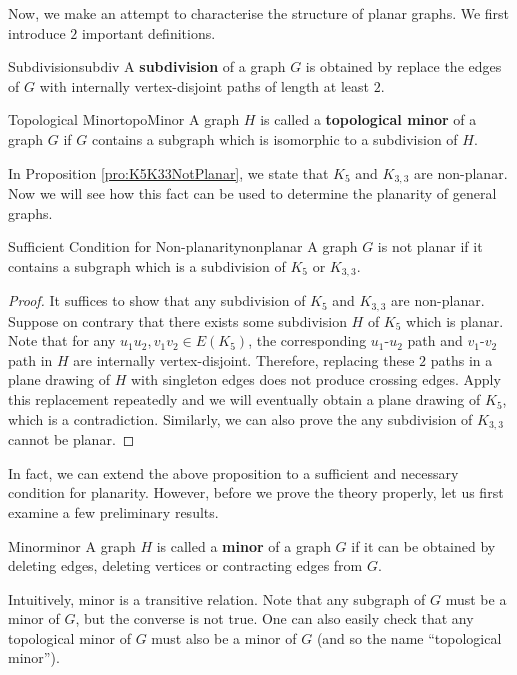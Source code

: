 \documentclass[math, code]{amznotes}
\theoremstyle{remark}
\begin{document}
Now, we make an attempt to characterise the structure of planar graphs. We first introduce $2$ important definitions.
\begin{dfnbox}{Subdivision}{subdiv}
    A {\color{red} \textbf{subdivision}} of a graph $G$ is obtained by replace the edges of $G$ with internally vertex-disjoint paths of length at least $2$.
\end{dfnbox}
\begin{dfnbox}{Topological Minor}{topoMinor}
    A graph $H$ is called a {\color{red} \textbf{topological minor}} of a graph $G$ if $G$ contains a subgraph which is isomorphic to a subdivision of $H$.
\end{dfnbox}
In Proposition \ref{pro:K5K33NotPlanar}, we state that $K_5$ and $K_{3, 3}$ are non-planar. Now we will see how this fact can be used to determine the planarity of general graphs.
\begin{probox}{Sufficient Condition for Non-planarity}{nonplanar}
    A graph $G$ is not planar if it contains a subgraph which is a subdivision of $K_5$ or $K_{3, 3}$.
    \tcblower
    \begin{proof}
        It suffices to show that any subdivision of $K_5$ and $K_{3, 3}$ are non-planar. Suppose on contrary that there exists some subdivision $H$ of $K_5$ which is planar. Note that for any $u_1u_2, v_1v_2 \in E(K_5)$, the corresponding $u_1$-$u_2$ path and $v_1$-$v_2$ path in $H$ are internally vertex-disjoint. Therefore, replacing these $2$ paths in a plane drawing of $H$ with singleton edges does not produce crossing edges. Apply this replacement repeatedly and we will eventually obtain a plane drawing of $K_5$, which is a contradiction. Similarly, we can also prove the any subdivision of $K_{3, 3}$ cannot be planar.
    \end{proof}
\end{probox}
In fact, we can extend the above proposition to a sufficient and necessary condition for planarity. However, before we prove the theory properly, let us first examine a few preliminary results.
\begin{dfnbox}{Minor}{minor}
    A graph $H$ is called a {\color{red} \textbf{minor}} of a graph $G$ if it can be obtained by deleting edges, deleting vertices or contracting edges from $G$.
\end{dfnbox}
Intuitively, minor is a transitive relation. Note that any subgraph of $G$ must be a minor of $G$, but the converse is not true. One can also easily check that any topological minor of $G$ must also be a minor of $G$ (and so the name ``topological minor''). 
\end{document}
